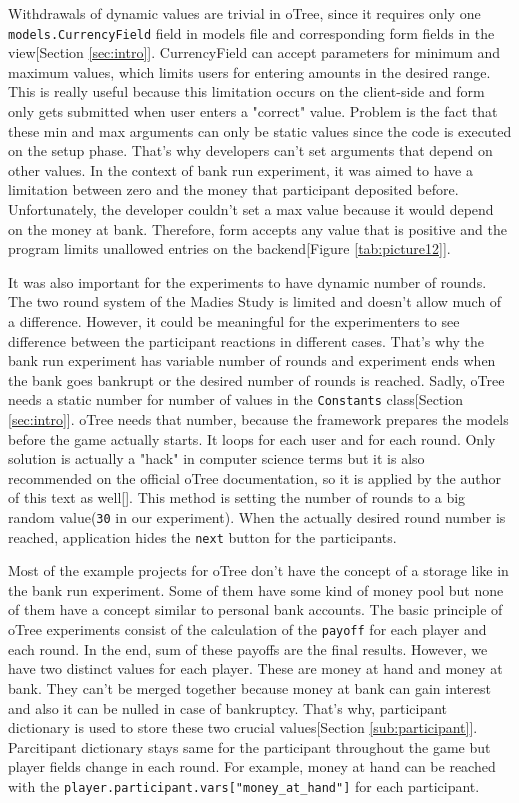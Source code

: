 Withdrawals of dynamic values are trivial in oTree, since it requires only one \verb|models.CurrencyField| field in models file and corresponding form fields in the view[Section \ref{sec:intro}]. CurrencyField can accept parameters for minimum and maximum values, which limits users for entering amounts in the desired range. This is really useful because this limitation occurs on the client-side and form only gets submitted when user enters a "correct" value. Problem is the fact that these min and max arguments can only be static values since the code is executed on the setup phase. That's why developers can't set arguments that depend on other values. In the context of  bank run experiment, it was aimed to have a limitation between zero and the money that participant deposited before. Unfortunately, the developer couldn't set a max value because it would depend on the money at bank. Therefore, form accepts any value that is positive and the program limits unallowed entries on the backend[Figure \ref{tab:picture12}]. 

It was also important for the experiments to have dynamic number of rounds. The two round system of the Madies Study is limited and doesn't allow much of a difference. However, it could be meaningful for the experimenters to see difference between the participant reactions in different cases. That's why the bank run experiment has variable number of rounds and experiment ends when the bank goes bankrupt or the desired number of rounds is reached. Sadly, oTree needs a static number for number of values in the \verb|Constants| class[Section \ref{sec:intro}]. oTree needs that number, because the framework prepares the models before the game actually starts. It loops for each user and for each round. Only solution is actually a "hack" in computer science terms but it is also recommended on the official oTree documentation, so it is applied by the author of this text as well[\cite{oTreeModel2017}]. This method is setting the number of rounds to a big random value(\verb|30| in our experiment). When the actually desired round number is reached, application hides the \verb|next| button for the participants.

Most of the example projects for oTree don't have the concept of a storage like in the bank run experiment. Some of them have some kind of money pool but none of them have a concept similar to personal bank accounts. The basic principle of oTree experiments consist of the calculation of the \verb|payoff| for each player and each round. In the end, sum of these payoffs are the final results. However, we have two distinct values for each player. These are money at hand and money at bank. They can't be merged together because money at bank can gain interest and also it can be nulled in case of bankruptcy. That's why, participant dictionary is used to store these two crucial values[Section \ref{sub:participant}]. Parcitipant dictionary stays same for the participant throughout the game but player fields change in each round. For example, money at hand can be reached with the \verb|player.participant.vars["money_at_hand"]| for each participant.

